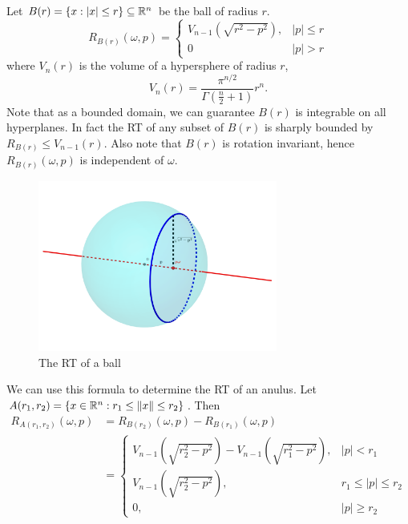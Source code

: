 \begin{myexample}
  Let $B(r) = \{x : |x| \leq r\} \subseteq \mathbb{R}^n$ be the ball of radius $r$.
  \[
    R_{B(r)}(\omega, p) = 
    \begin{cases}
      V_{n-1}\left(\sqrt{r^2 - p^2}\right), & |p| \leq r \\
      0 & |p| > r
    \end{cases}    
  \]
  where $V_n(r)$ is the volume of a hypersphere of radius $r$,
  \[
    V_n(r) = \frac{\pi^{n/2}}{\Gamma(\frac n2+1)} r^n.
  \]
  Note that as a bounded domain, we can guarantee $B(r)$ is integrable on all hyperplanes. In fact the RT of any subset of $B(r)$ is sharply bounded by $R_{B(r)} \leq V_{n-1}(r)$. Also note that $B(r)$ is rotation invariant, hence $R_{B(r)}(\omega, p)$ is independent of $\omega$.
  
  \begin{figure}[h]
    \centering
    \includegraphics[width=0.7\textwidth]{Images/Ball RT.png}
    \caption{The RT of a ball}\label{fig:RTBall}
  \end{figure}

  We can use this formula to determine the RT of an anulus. Let $A(r_1, r_2) = \{x \in \mathbb{R}^n: r_1 \leq \|x\| \leq r_2\}$. Then
  \begin{align*}
    R_{A(r_1, r_2)}(\omega, p) 
    &= R_{B(r_2)}(\omega, p) - R_{B(r_1)}(\omega, p) \\
    &= 
    \begin{cases}
      V_{n-1}(\sqrt{r_2^2 - p^2}) - V_{n-1}(\sqrt{r_1^2 - p^2}), & |p| < r_1 \\
      V_{n-1}(\sqrt{r_2^2 - p^2}), & r_1 \leq |p| \leq r_2 \\
      0, & |p| \geq r_2
    \end{cases}
  \end{align*}
\end{myexample}
 


